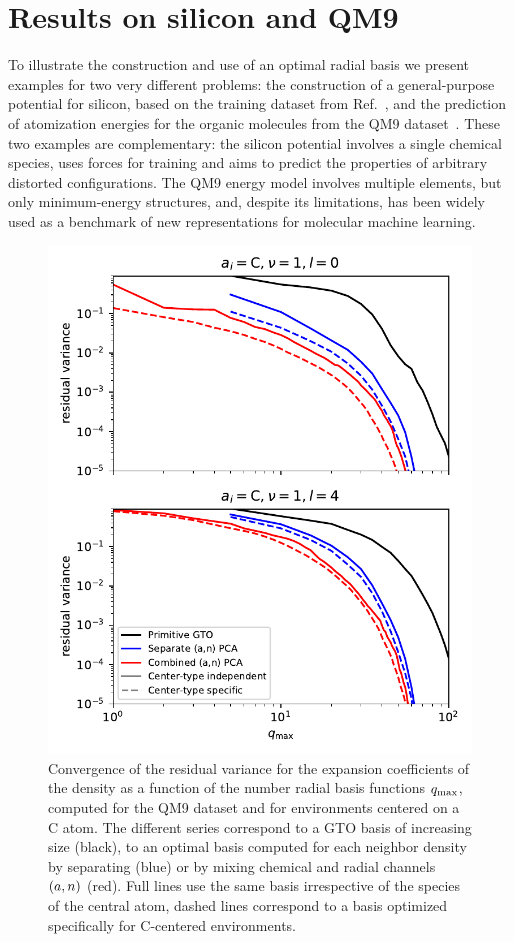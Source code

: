 \section{Results on silicon and QM9}
\label{sec:practice}
To illustrate the construction and use of an optimal radial basis we present examples for two very different problems: the construction of a general-purpose potential for silicon, based on the training dataset from Ref.~, and the prediction of atomization energies for the organic molecules from the QM9 dataset~\cite{rama+14sd}.
These two examples are complementary: the silicon potential involves a single chemical species, uses forces for training and aims to predict the properties of arbitrary distorted configurations.
The QM9 energy model involves multiple elements, but only minimum-energy structures, and, despite its limitations, has been widely used as a benchmark of new representations for molecular machine learning\cite{fabe+17jctc}.

\begin{figure}[tbhp]
    \centering
        \includegraphics[width=0.7\linewidth]{fig/optbasis/qm9-selected-variance-density.pdf}
    \caption{ Convergence of the residual variance for the expansion coefficients of the density as a function of the number radial basis functions $q_\mathrm{max}$, computed for the QM9 dataset and for environments centered on a C atom. The different series correspond to a GTO basis of increasing size (black), to an optimal basis computed for each neighbor density by separating (blue) or by mixing chemical and radial channels $(a, n)$ (red). Full lines use the same basis irrespective of the species of the central atom, dashed lines correspond to a basis optimized specifically for C-centered environments.  }
    \label{fig:qm9-density-variance}
\end{figure}

